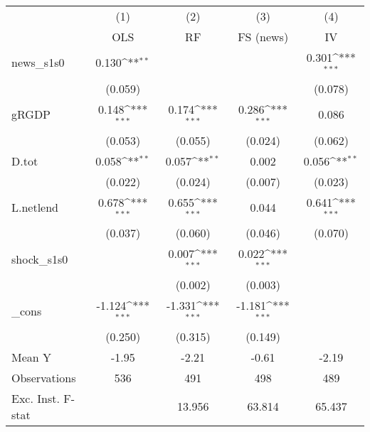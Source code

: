 {
\def\sym#1{\ifmmode^{#1}\else\(^{#1}\)\fi}
\begin{tabular}{l*{4}{c}}
\toprule
            &\multicolumn{1}{c}{(1)}&\multicolumn{1}{c}{(2)}&\multicolumn{1}{c}{(3)}&\multicolumn{1}{c}{(4)}\\
            &\multicolumn{1}{c}{OLS}&\multicolumn{1}{c}{RF}&\multicolumn{1}{c}{FS (news)}&\multicolumn{1}{c}{IV}\\
\midrule
news\_s1s0   &       0.130\sym{**} &                     &                     &       0.301\sym{***}\\
            &     (0.059)         &                     &                     &     (0.078)         \\
\addlinespace
gRGDP       &       0.148\sym{***}&       0.174\sym{***}&       0.286\sym{***}&       0.086         \\
            &     (0.053)         &     (0.055)         &     (0.024)         &     (0.062)         \\
\addlinespace
D.tot       &       0.058\sym{**} &       0.057\sym{**} &       0.002         &       0.056\sym{**} \\
            &     (0.022)         &     (0.024)         &     (0.007)         &     (0.023)         \\
\addlinespace
L.netlend   &       0.678\sym{***}&       0.655\sym{***}&       0.044         &       0.641\sym{***}\\
            &     (0.037)         &     (0.060)         &     (0.046)         &     (0.070)         \\
\addlinespace
shock\_s1s0  &                     &       0.007\sym{***}&       0.022\sym{***}&                     \\
            &                     &     (0.002)         &     (0.003)         &                     \\
\addlinespace
\_cons      &      -1.124\sym{***}&      -1.331\sym{***}&      -1.181\sym{***}&                     \\
            &     (0.250)         &     (0.315)         &     (0.149)         &                     \\
\midrule
Mean Y      &       -1.95         &       -2.21         &       -0.61         &       -2.19         \\
Observations&         536         &         491         &         498         &         489         \\
Exc. Inst. F-stat&                     &      13.956         &      63.814         &      65.437         \\
\bottomrule
\end{tabular}
}
